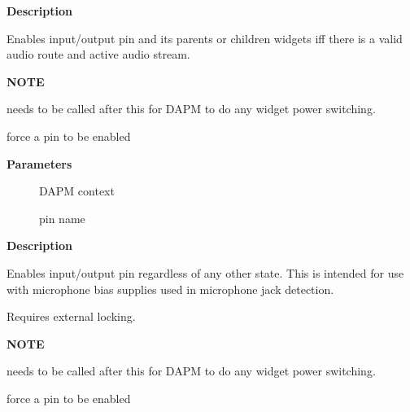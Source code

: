 \documentclass[a4paper,8pt,english]{sphinxmanual}
\begin{document}
\textbf{Description}

Enables input/output pin and its parents or children widgets iff there is
a valid audio route and active audio stream.

\textbf{NOTE}

{\hyperref[sound/kernel\string-api/alsa\string-driver\string-api:c.snd_soc_dapm_sync]{\emph{}}} needs to be called after this for DAPM to
do any widget power switching.

\begin{fulllineitems}
\label{sound/kernel-api/alsa-driver-api:c.snd_soc_dapm_force_enable_pin_unlocked}
force a pin to be enabled

\end{fulllineitems}


\textbf{Parameters}
\begin{description}
\item[{}] \leavevmode
DAPM context

\item[{}] \leavevmode
pin name

\end{description}

\textbf{Description}

Enables input/output pin regardless of any other state.  This is
intended for use with microphone bias supplies used in microphone
jack detection.

Requires external locking.

\textbf{NOTE}

{\hyperref[sound/kernel\string-api/alsa\string-driver\string-api:c.snd_soc_dapm_sync]{\emph{}}} needs to be called after this for DAPM to
do any widget power switching.

\begin{fulllineitems}
\label{sound/kernel-api/alsa-driver-api:c.snd_soc_dapm_force_enable_pin}
force a pin to be enabled

\end{fulllineitems}
\end{document}

